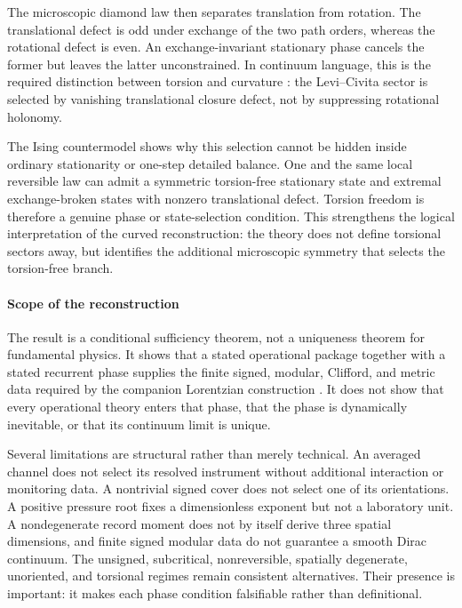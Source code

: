 \documentclass[11pt]{article}
\theoremstyle{definition}
\theoremstyle{remark}
\begin{document}
The microscopic diamond law then separates translation from rotation.  The
translational defect is odd under exchange of the two path orders, whereas the
rotational defect is even.  An exchange-invariant stationary phase cancels the
former but leaves the latter unconstrained.  In continuum language, this is the
required distinction between torsion and curvature
\cite{Hehl1976}: the Levi--Civita sector is selected by vanishing translational
closure defect, not by suppressing rotational holonomy.

The Ising countermodel shows why this selection cannot be hidden inside ordinary
stationarity or one-step detailed balance.  One and the same local reversible
law can admit a symmetric torsion-free stationary state and extremal
exchange-broken states with nonzero translational defect.  Torsion freedom is
therefore a genuine phase or state-selection condition.  This strengthens the
logical interpretation of the curved reconstruction: the theory does not define
torsional sectors away, but identifies the additional microscopic symmetry
that selects the torsion-free branch.

\paragraph{Scope of the reconstruction} The result is a conditional sufficiency theorem, not a uniqueness theorem for
fundamental physics.  It shows that a stated operational package together with
a stated recurrent phase supplies the finite signed, modular, Clifford, and
metric data required by the companion Lorentzian construction
\cite{PelissierLorentzian2026}.  It does not show that every operational theory
enters that phase, that the phase is dynamically inevitable, or that its
continuum limit is unique.

Several limitations are structural rather than merely technical.  An averaged
channel does not select its resolved instrument without additional interaction
or monitoring data.  A nontrivial signed cover does not select one of its
orientations.  A positive pressure root fixes a dimensionless exponent but not
a laboratory unit.  A nondegenerate record moment does not by itself derive
three spatial dimensions, and finite signed modular data do not guarantee a
smooth Dirac continuum.  The unsigned, subcritical, nonreversible, spatially
degenerate, unoriented, and torsional regimes remain consistent alternatives.
Their presence is important: it makes each phase condition falsifiable rather
than definitional.
\end{document}

